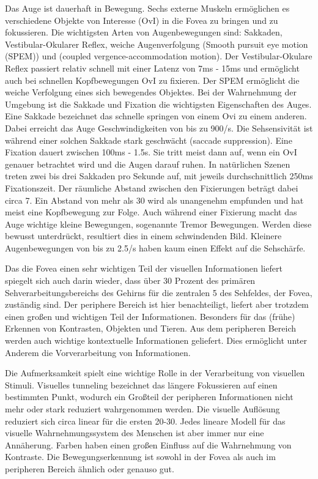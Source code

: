 Das Auge ist dauerhaft in Bewegung.
Sechs externe Muskeln ermöglichen es verschiedene Objekte von Interesse (OvI) in die Fovea zu bringen und zu fokussieren.
Die wichtigsten Arten von Augenbewegungen sind: Sakkaden, Vestibular-Okularer Reflex, weiche Augenverfolgung (Smooth pursuit eye motion (SPEM)) und (coupled vergence-accommodation motion).
Der Vestibular-Okulare Reflex passiert relativ schnell mit einer Latenz von 7ms - 15ms und ermöglicht auch bei schnellen Kopfbewegungen OvI zu fixieren.
Der SPEM ermöglicht die weiche Verfolgung eines sich bewegendes Objektes.
Bei der Wahrnehmung der Umgebung ist die Sakkade und Fixation die wichtigsten Eigenschaften des Auges.
Eine Sakkade bezeichnet das schnelle springen von einem Ovi zu einem anderen.
Dabei erreicht das Auge Geschwindigkeiten von bis zu 900\textdegree/s.
Die Sehsensivität ist während einer solchen Sakkade stark geschwächt (saccade suppression).
Eine Fixation dauert zwischen 100ms - 1.5s.
Sie tritt meist dann auf, wenn ein OvI genauer betrachtet wird und die Augen darauf ruhen.
In natürlichen Szenen treten zwei bis drei Sakkaden pro Sekunde auf, mit jeweils durchschnittlich 250ms Fixationszeit.
Der räumliche Abstand zwischen den Fixierungen beträgt dabei circa 7\textdegree{}.
Ein Abstand von mehr als 30\textdegree{} wird als unangenehm empfunden und hat meist eine Kopfbewegung zur Folge.
Auch während einer Fixierung macht das Auge wichtige kleine Bewegungen, sogenannte Tremor Bewegungen.
Werden diese bewusst unterdrückt, resultiert dies in einem schwindenden Bild.
Kleinere Augenbewegungen von bis zu 2.5\textdegree{}/s haben kaum einen Effekt auf die Sehschärfe.

Das die Fovea einen sehr wichtigen Teil der visuellen Informationen liefert spiegelt sich auch darin wieder, dass über 30 Prozent des primären Sehverarbeitungsbereichs des Gehirns für die zentralen 5\textdegree{} des Sehfeldes, der Fovea, zuständig sind.
Der periphere Bereich ist hier benachteiligt, liefert aber trotzdem einen großen und wichtigen Teil der Informationen.
Besonders für das (frühe) Erkennen von Kontrasten, Objekten und Tieren.
Aus dem peripheren Bereich werden auch wichtige kontextuelle Informationen geliefert.
Dies ermöglicht unter Anderem die Vorverarbeitung von Informationen.

Die Aufmerksamkeit spielt eine wichtige Rolle in der Verarbeitung von visuellen Stimuli. %
Visuelles tunneling bezeichnet das längere Fokussieren auf einen bestimmten Punkt, wodurch ein Großteil der peripheren Informationen nicht mehr oder stark reduziert wahrgenommen werden.
Die visuelle Auflösung reduziert sich circa linear für die ersten 20-30\textdegree{}.
Jedes lineare Modell für das visuelle Wahrnehmungssystem des Menschen ist aber immer nur eine Annäherung.
Farben haben einen großen Einfluss auf die Wahrnehmung von Kontraste.
Die Bewegungserkennung ist sowohl in der Fovea als auch im peripheren Bereich ähnlich oder genauso gut.

